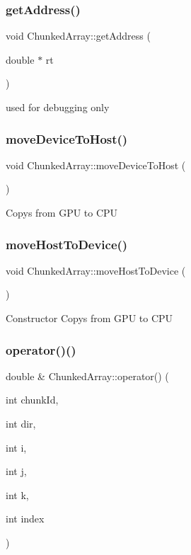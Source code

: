 \subsubsection{\texorpdfstring{get\+Address()}{getAddress()}}
{\footnotesize\ttfamily void Chunked\+Array\+::get\+Address (\begin{DoxyParamCaption}\item[{double $\ast$}]{rt }\end{DoxyParamCaption})}

used for debugging only \mbox{\label{classChunkedArray_a06ea03d909d7072852e92bd159a6c719}} 
\subsubsection{\texorpdfstring{move\+Device\+To\+Host()}{moveDeviceToHost()}}
{\footnotesize\ttfamily void Chunked\+Array\+::move\+Device\+To\+Host (\begin{DoxyParamCaption}{ }\end{DoxyParamCaption})}

Copys from G\+PU to C\+PU \mbox{\label{classChunkedArray_a1ae58bbd5d8e5e628c43f1fc0c222427}} 
\subsubsection{\texorpdfstring{move\+Host\+To\+Device()}{moveHostToDevice()}}
{\footnotesize\ttfamily void Chunked\+Array\+::move\+Host\+To\+Device (\begin{DoxyParamCaption}{ }\end{DoxyParamCaption})}

Constructor Copys from G\+PU to C\+PU \mbox{\label{classChunkedArray_af75eed0a52df1e58499bd7f8fae03f49}} 
\subsubsection{\texorpdfstring{operator()()}{operator()()}}
{\footnotesize\ttfamily double \& Chunked\+Array\+::operator() (\begin{DoxyParamCaption}\item[{int}]{chunk\+Id,  }\item[{int}]{dir,  }\item[{int}]{i,  }\item[{int}]{j,  }\item[{int}]{k,  }\item[{int}]{index }\end{DoxyParamCaption})}

